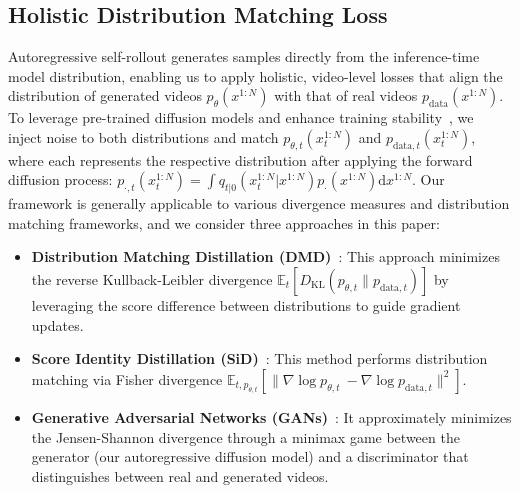 \documentclass{article}
\begin{document}
\subsection{Holistic Distribution Matching Loss}
\label{sec:loss}
Autoregressive self-rollout generates samples directly from the inference-time model distribution, enabling us to apply holistic, video-level losses that align the distribution of generated videos \( p_\theta(x^{1:N}) \) with that of real videos \( p_{\text{data}}(x^{1:N}) \).
To leverage pre-trained diffusion models and enhance training stability~\cite{jenni2019stabilizing}, we inject noise to both distributions and match \( p_{\theta, t}(x^{1:N}_t) \) and \( p_{\text{data}, t}(x^{1:N}_t) \), where each represents the respective distribution after applying the forward diffusion process: \( p_{\cdot, t}(x^{1:N}_t) = \int q_{t|0}(x^{1:N}_t | x^{1:N}) p_{\cdot}(x^{1:N}) \mathrm{d} x^{1:N} \).
Our framework is generally applicable to various divergence measures and distribution matching frameworks, and we consider three approaches in this paper:
\begin{itemize}


  \item \textbf{Distribution Matching Distillation (DMD)}~\cite{yin2024one,yin2024improved}: This approach minimizes the reverse Kullback-Leibler divergence $\mathbb{E}_{t} [ D_\text{KL}(p_{\theta, t} \| p_{\text{data}, t}) ]$ by leveraging the score difference between distributions to guide gradient updates.
  \item \textbf{Score Identity Distillation (SiD)}~\cite{zhou2024score,zhou2025adversarial}: This method performs distribution matching via Fisher divergence $\mathbb E_{t, p_{\theta, t}}[\| \nabla \log p_{\theta, t}\ - \nabla \log p_{\text{data}, t}\|^2]$.

  \item \textbf{Generative Adversarial Networks (GANs)}~\cite{goodfellow2014generative}: It approximately minimizes the Jensen-Shannon divergence through a minimax game between the generator (our autoregressive diffusion model) and a discriminator that distinguishes between real and generated videos.
\end{itemize}
\end{document}
